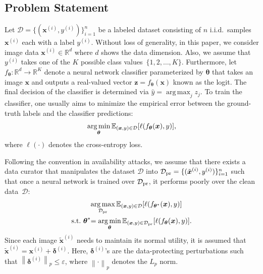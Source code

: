 \documentclass[conference]{IEEEtran}
\theoremstyle{definition}
\theoremstyle{remark}
\theoremstyle{proposition}
\newcommand{\norm}[1]{\left\lVert#1\right\rVert}
\DeclareMathOperator*{\argmax}{arg\,max}
\DeclareMathOperator*{\argmin}{arg\,min}
\begin{document}
\subsection{Problem Statement}\label{sec:sec:statement}

Let $\mathcal{D}=\{(\boldsymbol{x}^{(i)}, y^{(i)})\}_{i=1}^{n}$ be a labeled dataset consisting of $n$ i.i.d.~samples~$\boldsymbol{x}^{(i)}$ each with a label $y^{(i)}$.
Without loss of generality, in this paper, we consider image data $\boldsymbol{x}^{(i)} \in \mathbb{R}^{d}$ where $d$ shows the data dimension.
Also, we assume that $y^{(i)}$ takes one of the $K$ possible class values~$\{1, 2, \dots, K\}$.
Furthermore, let ${f_{\boldsymbol{\theta}}: \mathbb{R}^{d} \rightarrow \mathbb{R}^{K}}$ denote a neural network classifier parameterized by ${\boldsymbol{\theta}}$ that takes an image $\boldsymbol{x}$ and outputs a real-valued vector ${\boldsymbol{z} = f_{\boldsymbol{\theta}}(\boldsymbol{x})}$ known as the logit.
The final decision of the classifier is determined via $\hat{y} = \argmax_{j} {z}_{j}$.
To train the classifier, one usually aims to minimize the empirical error between the ground-truth labels and the classifier predictions:
\begin{equation}\label{eq:empirical_error}
    \small{\argmin_{\boldsymbol{\theta}}\mathbb{E}_{(\boldsymbol{x}, y) \in \mathcal{D}}[\ell(f_{\boldsymbol{\theta}}(\boldsymbol{x}), y)]},
\end{equation}
where $\ell(\cdot)$ denotes the cross-entropy loss.

Following the convention in availability attacks, we assume that there exists a data curator that manipulates the dataset $\mathcal{D}$ into ${\mathcal{D}_{\rm pr}=\{(\tilde{\boldsymbol{x}}^{(i)}, y^{(i)})\}_{i=1}^{n}}$ such that once a neural network is trained over $\mathcal{D}_{\rm pr}$, it performs poorly over the clean data~$\mathcal{D}$:
\begin{align}\label{eq:threat_model}\nonumber
    & \small{\argmax_{\mathcal{D}_{\rm pr}} \mathbb{E}_{(\boldsymbol{x}, y) \in \mathcal{D}}[\ell(f_{\boldsymbol{\theta}^{*}}(\boldsymbol{x}), y)]}\\
    \small{\text{s.t.}~\boldsymbol{\theta}^{*}} &\small{= \argmin_{\boldsymbol{\theta}}\mathbb{E}_{(\boldsymbol{x}, y) \in \mathcal{D}_{\rm pr}}[\ell(f_{\boldsymbol{\theta}}(\boldsymbol{x}), y)]}.
\end{align}
Since each image $\tilde{\boldsymbol{x}}^{(i)}$ needs to maintain its normal utility, it is assumed that $\tilde{\boldsymbol{x}}^{(i)} = \boldsymbol{x}^{(i)} + \boldsymbol{\delta}^{(i)}$.
Here, $\boldsymbol{\delta}^{(i)}$'s are the data-protecting perturbations such that $\norm{\boldsymbol{\delta}^{(i)}}_{p} \leq \varepsilon$, where $\norm{\cdot}_{p}$ denotes the $L_p$ norm.
\end{document}
